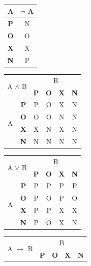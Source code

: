 \documentclass[11pt, a4paper]{article}
\begin{document}
\begin{table}[h]
\begin{center}
    \begin{tabular}{|c|c|}
    \hline
         A & $\neg$ A \\ \hline
         \textbf{P} & N \\ \hline
         \textbf{O} & O \\ \hline
         \textbf{X} & X \\ \hline
         \textbf{N} & P \\ \hline
    \end{tabular}
    \begin{tabular}{|c|c|c|c|c|c|}
    \hline
        \multicolumn{2}{|c|}{\multirow{2}{*}{{A $\land$ B}}} & \multicolumn{4}{c|}{B} \\
        \cline{3-6}
        \multicolumn{2}{|c|}{} & \textbf{P} & \textbf{O} &\textbf{X}& \textbf{N} \\
        \hline
        \multirow{4}{*}{A} & \textbf{P} & P & O & X & N \\
        \cline{2-6}
        & \textbf{O} & O & O & N & N \\
        \cline{2-6}
        & \textbf{X} & X & N & X & N \\
        \cline{2-6}
        & \textbf{N} & N & N & N & N \\
        \hline
    \end{tabular}
    \begin{tabular}{|c|c|c|c|c|c|}
    \hline
        \multicolumn{2}{|c|}{\multirow{2}{*}{{A $\lor$ B}}} & \multicolumn{4}{c|}{B} \\
        \cline{3-6}
        \multicolumn{2}{|c|}{} & \textbf{P} & \textbf{O} &\textbf{X}& \textbf{N} \\
        \hline
        \multirow{4}{*}{A} & \textbf{P} & P & P & P & P \\
        \cline{2-6}
        & \textbf{O} & P & O & P & O \\
        \cline{2-6}
        & \textbf{X} & P & P & X & X \\
        \cline{2-6}
        & \textbf{N} & P & O & X & N \\
        \hline
    \end{tabular}
    \begin{tabular}{|c|c|c|c|c|c|}
    \hline
        \multicolumn{2}{|c|}{\multirow{2}{*}{{A $\to$ B}}} & \multicolumn{4}{c|}{B} \\
        \cline{3-6}
        \multicolumn{2}{|c|}{} & \textbf{P} & \textbf{O} &\textbf{X}& \textbf{N} \\

\end{tabular}
\end{center}
\end{table}
\end{document}
